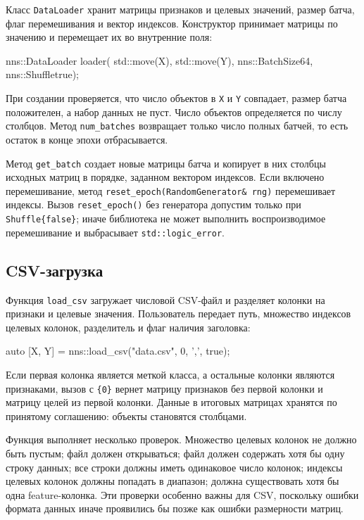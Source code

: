 \documentclass{article}
\begin{document}
Класс \texttt{DataLoader} хранит матрицы признаков и целевых значений,
размер батча, флаг перемешивания и вектор индексов. Конструктор
принимает матрицы по значению и перемещает их во внутренние поля:
\begin{cppcode}
nns::DataLoader loader(
    std::move(X),
    std::move(Y),
    nns::BatchSize{64},
    nns::Shuffle{true});
\end{cppcode}
При создании проверяется, что число объектов в \texttt{X} и \texttt{Y}
совпадает, размер батча положителен, а набор данных не пуст. Число
объектов определяется по числу столбцов. Метод \texttt{num\_batches}
возвращает только число полных батчей, то есть остаток в конце эпохи
отбрасывается.

Метод \texttt{get\_batch} создает новые матрицы батча и копирует в них
столбцы исходных матриц в порядке, заданном вектором индексов. Если
включено перемешивание, метод \texttt{reset\_epoch(RandomGenerator\&
rng)} перемешивает индексы. Вызов \texttt{reset\_epoch()} без
генератора допустим только при \texttt{Shuffle\{false\}}; иначе
библиотека не может выполнить воспроизводимое перемешивание и
выбрасывает \texttt{std::logic\_error}.

\subsection{CSV-загрузка}

Функция \texttt{load\_csv} загружает числовой CSV-файл и разделяет
колонки на признаки и целевые значения. Пользователь передает путь,
множество индексов целевых колонок, разделитель и флаг наличия
заголовка:
\begin{cppcode}
auto [X, Y] = nns::load_csv("data.csv", {0}, ',', true);
\end{cppcode}
Если первая колонка является меткой класса, а остальные колонки
являются признаками, вызов с \texttt{\{0\}} вернет матрицу признаков
без первой колонки и матрицу целей из первой колонки. Данные в
итоговых матрицах хранятся по принятому соглашению: объекты становятся
столбцами.

Функция выполняет несколько проверок. Множество целевых колонок не
должно быть пустым; файл должен открываться; файл должен содержать
хотя бы одну строку данных; все строки должны иметь одинаковое число
колонок; индексы целевых колонок должны попадать в диапазон; должна
существовать хотя бы одна feature-колонка. Эти проверки особенно важны
для CSV, поскольку ошибки формата данных иначе проявились бы позже как
ошибки размерности матриц.
\end{document}
